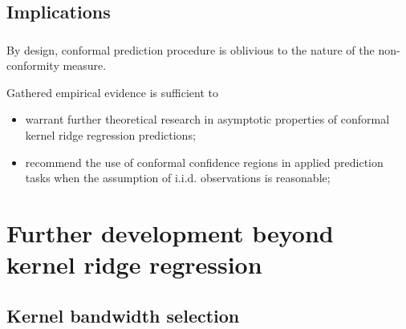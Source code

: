 \documentclass[t]{beamer}  %
\begin{document}

\subsection{Implications} %
\label{sub:implications}

\begin{frame}[c]\frametitle{\insertsection}
  \framesubtitle{\insertsubsection}
  By design, conformal prediction procedure is oblivious to the nature of
  the non-conformity measure.

  \vspace{\baselineskip}
  Gathered empirical evidence is sufficient to \begin{itemize}
    \item warrant further theoretical research in asymptotic properties of conformal
    kernel ridge regression predictions;
    \item recommend the use of conformal confidence regions in applied prediction
    tasks when the assumption of i.i.d. observations is reasonable;
  \end{itemize}
\end{frame}



\section{Further development beyond kernel ridge regression} %
\label{sec:further_development_beyond_krr}

\subsection{Kernel bandwidth selection} %
\label{sub:kernel_bandwidth_selection}
\end{document}
